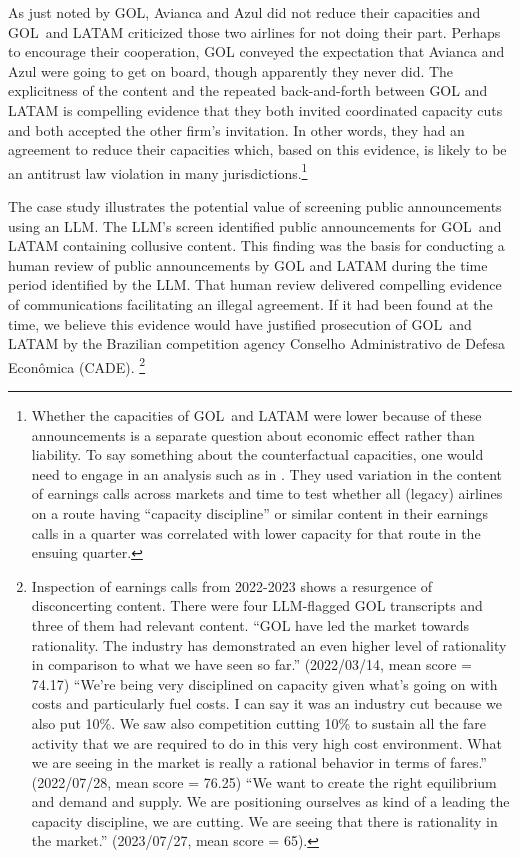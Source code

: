 \noindent As just noted by GOL, Avianca and
Azul did not reduce their capacities and GOL\ and LATAM criticized those two
airlines for not doing their part. Perhaps to encourage their cooperation,
GOL conveyed the expectation that Avianca and Azul were going to get on
board, though apparently they never did. The explicitness of the content and
the repeated back-and-forth between GOL and LATAM is compelling evidence
that they both invited coordinated capacity cuts and both accepted the other
firm's invitation. In other words, they had an agreement to reduce their
capacities which, based on this evidence, is likely to be an antitrust law
violation in many jurisdictions.\footnote{%
Whether the capacities of GOL\ and LATAM were lower because of these
announcements is a separate question about economic effect rather than
liability. To say something about the counterfactual capacities, one would
need to engage in an analysis such as in \textcite{aryal2022coordinated}.
They used variation in the content of earnings calls across markets and
time to test whether all (legacy) airlines on a route having ``capacity
discipline'' or similar content in their earnings calls in a quarter was
correlated with lower capacity for that route in the ensuing quarter.}

The case study illustrates the potential value of screening public
announcements using an LLM. The LLM's screen identified public announcements
for GOL\ and LATAM containing collusive content. This finding was the basis
for conducting a human review of public announcements by GOL and LATAM
during the time period identified by the LLM. That human review delivered
compelling evidence of communications facilitating an illegal agreement. If
it had been found at the time, we believe this evidence would have justified
prosecution of GOL\ and LATAM by the Brazilian competition agency Conselho
Administrativo de Defesa Econ\^{o}mica (CADE).%
\footnote{%
Inspection of earnings calls from 2022-2023 shows a resurgence of
disconcerting content. There were four LLM-flagged GOL transcripts and three
of them had relevant content. ``GOL have led the market towards
rationality. The industry has demonstrated an even higher level of
rationality in comparison to what we have seen so far.'' (2022/03/14, mean score 
= 74.17) ``We're being very disciplined on
capacity given what's going on with costs and particularly fuel costs. I can
say it was an industry cut because we also put 10\%. We saw also competition
cutting 10\% to sustain all the fare activity that we are required to do in
this very high cost environment. What we are seeing in the market is really
a rational behavior in terms of fares.'' (2022/07/28, mean score = 76.25) ``We want to create the right equilibrium
and demand and supply. We are positioning ourselves as kind of a leading the
capacity discipline, we are cutting. We are seeing that there is rationality
in the market.'' (2023/07/27, mean score = 65). %
}

